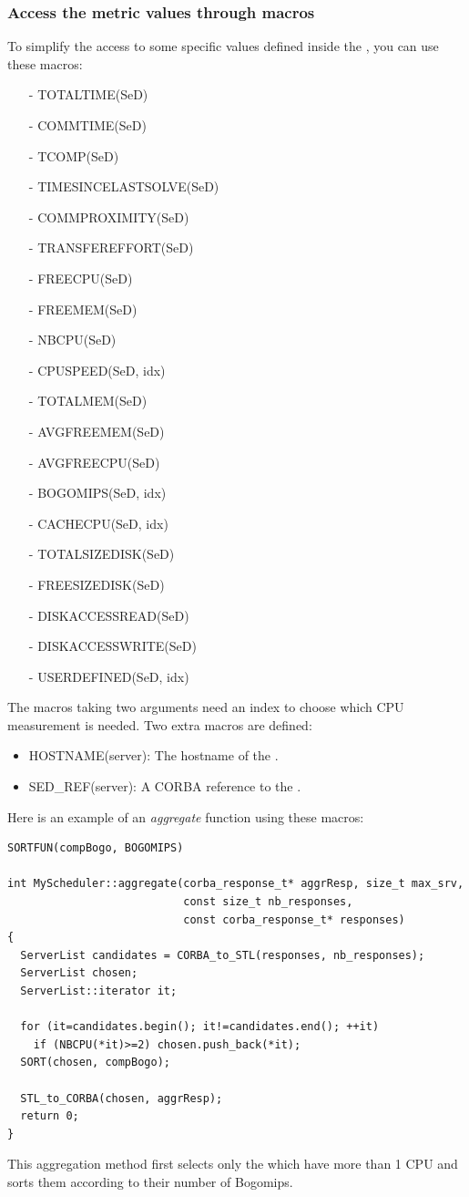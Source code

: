 \subsubsection{Access the metric values through macros}
\label{sec:metricMacros}
To simplify the access to some specific values defined inside the {\sed}, you can
use these macros:
\begin{itemize}
  \item[-] TOTALTIME(SeD)
  \item[-] COMMTIME(SeD)
  \item[-] TCOMP(SeD)
  \item[-] TIMESINCELASTSOLVE(SeD)
  \item[-] COMMPROXIMITY(SeD)
  \item[-] TRANSFEREFFORT(SeD)
  \item[-] FREECPU(SeD)
  \item[-] FREEMEM(SeD)
  \item[-] NBCPU(SeD)
  \item[-] CPUSPEED(SeD, idx)
  \item[-] TOTALMEM(SeD)
  \item[-] AVGFREEMEM(SeD)
  \item[-] AVGFREECPU(SeD)
  \item[-] BOGOMIPS(SeD, idx)
  \item[-] CACHECPU(SeD, idx)
  \item[-] TOTALSIZEDISK(SeD)
  \item[-] FREESIZEDISK(SeD)
  \item[-] DISKACCESSREAD(SeD)
  \item[-] DISKACCESSWRITE(SeD)
  \item[-] USERDEFINED(SeD, idx)
\end{itemize}
The macros taking two arguments need an index to choose which CPU measurement
is needed. Two extra macros are defined:
\begin{itemize}
  \item HOSTNAME(server): The hostname of the {\sed}.
  \item SED\_REF(server): A CORBA reference to the {\sed}.
\end{itemize}

Here is an example of an \textit{aggregate} function using these macros:
\begin{verbatim}
SORTFUN(compBogo, BOGOMIPS)

int MyScheduler::aggregate(corba_response_t* aggrResp, size_t max_srv,
                           const size_t nb_responses,
                           const corba_response_t* responses)
{
  ServerList candidates = CORBA_to_STL(responses, nb_responses);
  ServerList chosen;
  ServerList::iterator it;

  for (it=candidates.begin(); it!=candidates.end(); ++it)
    if (NBCPU(*it)>=2) chosen.push_back(*it);
  SORT(chosen, compBogo);

  STL_to_CORBA(chosen, aggrResp);
  return 0;
}
\end{verbatim}
This aggregation method first selects only the {\sed} which have more than 1 CPU
and sorts them according to their number of Bogomips.

